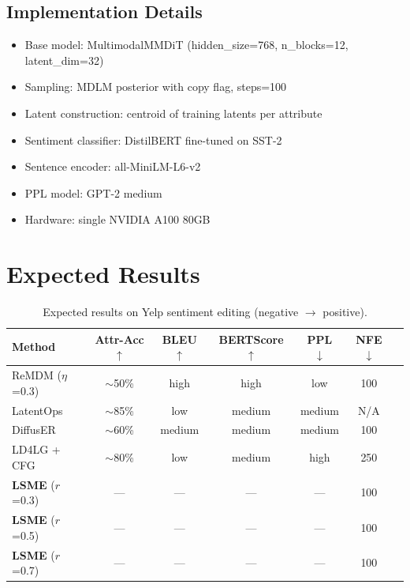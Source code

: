 \documentclass{article}
\begin{document}
\subsection{Implementation Details}

\begin{itemize}
    \item Base model: MultimodalMMDiT (hidden\_size=768, n\_blocks=12, latent\_dim=32)
    \item Sampling: MDLM posterior with copy flag, steps=100
    \item Latent construction: centroid of training latents per attribute
    \item Sentiment classifier: DistilBERT fine-tuned on SST-2
    \item Sentence encoder: all-MiniLM-L6-v2
    \item PPL model: GPT-2 medium
    \item Hardware: single NVIDIA A100 80GB
\end{itemize}

\section{Expected Results}

\begin{table}[h]
\centering
\caption{Expected results on Yelp sentiment editing (negative $\to$ positive).}
\begin{tabular}{lcccccc}
\toprule
\textbf{Method} & \textbf{Attr-Acc} $\uparrow$ & \textbf{BLEU} $\uparrow$ & \textbf{BERTScore} $\uparrow$ & \textbf{PPL} $\downarrow$ & \textbf{NFE} $\downarrow$ \\
\midrule
ReMDM ($\eta$=0.3) & $\sim$50\% & high & high & low & 100 \\
LatentOps & $\sim$85\% & low & medium & medium & N/A \\
DiffusER & $\sim$60\% & medium & medium & medium & 100 \\
LD4LG + CFG & $\sim$80\% & low & medium & high & 250 \\
\textbf{LSME} ($r$=0.3) & --- & --- & --- & --- & 100 \\
\textbf{LSME} ($r$=0.5) & --- & --- & --- & --- & 100 \\
\textbf{LSME} ($r$=0.7) & --- & --- & --- & --- & 100 \\
\bottomrule
\end{tabular}
\end{table}
\end{document}
